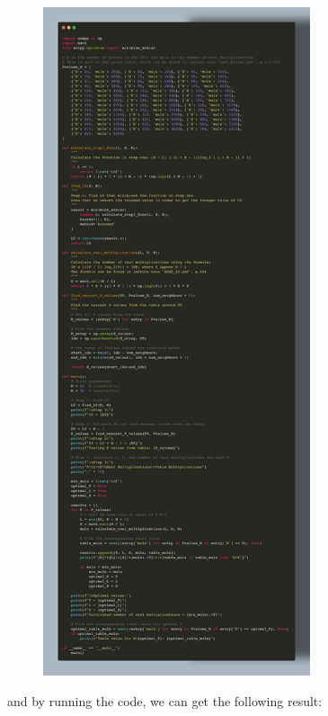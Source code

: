\documentclass{article}
\begin{document}
\begin{figure}[H]
    \centering
    \includegraphics[width=0.7\textwidth]{HW4_img/7_code.png}
\end{figure}

and by running the code, we can get the following result:
\end{document}

